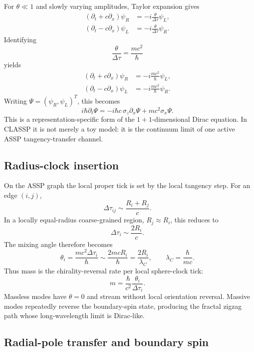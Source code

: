 \documentclass[11pt,a4paper]{article}
\begin{document}
For \(\theta\ll1\) and slowly varying amplitudes, Taylor expansion gives
\begin{align}
  (\partial_t+c\partial_x)\psi_R
    &=-i\frac{\theta}{\Delta\tau}\psi_L,
  \label{eq:chiral_R_theta}\\
  (\partial_t-c\partial_x)\psi_L
    &=-i\frac{\theta}{\Delta\tau}\psi_R.
  \label{eq:chiral_L_theta}
\end{align}
Identifying
\[
  \frac{\theta}{\Delta\tau}=\frac{mc^2}{\hbar}
\]
yields
\begin{align}
  (\partial_t+c\partial_x)\psi_R
    &=-i\frac{mc^2}{\hbar}\psi_L,
  \label{eq:chiral_R}\\
  (\partial_t-c\partial_x)\psi_L
    &=-i\frac{mc^2}{\hbar}\psi_R.
  \label{eq:chiral_L}
\end{align}
Writing \(\Psi=(\psi_R,\psi_L)^T\), this becomes
\[
  \boxed{
  i\hbar\partial_t\Psi
  =
  -i\hbar c\,\sigma_z\partial_x\Psi
  +mc^2\sigma_x\Psi.}
  \label{eq:dirac_1d}
\]
This is a representation-specific form of the \(1+1\)-dimensional Dirac
equation.  In CLASSP it is not merely a toy model: it is the continuum limit of
one active ASSP tangency-transfer channel.

\subsection{Radius-clock insertion}

On the ASSP graph the local proper tick is set by the local tangency step.  For
an edge \((i,j)\),
\[
  \Delta\tau_{ij}\sim\frac{R_i+R_j}{c}.
  \label{eq:tick_radius_edge}
\]
In a locally equal-radius coarse-grained region, \(R_j\approx R_i\), this
reduces to
\[
  \Delta\tau_i\sim\frac{2R_i}{c}.
  \label{eq:tick_radius}
\]
The mixing angle therefore becomes
\[
  \theta_i
  =
  \frac{mc^2\Delta\tau_i}{\hbar}
  \sim
  \frac{2mcR_i}{\hbar}
  =
  \frac{2R_i}{\lambda_C},
  \qquad
  \lambda_C=\frac{\hbar}{mc}.
  \label{eq:theta_radius}
\]
Thus mass is the chirality-reversal rate per local sphere-clock tick:
\[
  \boxed{
  m=\frac{\hbar}{c^2}\frac{\theta_i}{\Delta\tau_i}.}
  \label{eq:mass_flip}
\]
Massless modes have \(\theta=0\) and stream without local orientation reversal.
Massive modes repeatedly reverse the boundary-spin state, producing the
fractal zigzag path whose long-wavelength limit is Dirac-like.

\subsection{Radial-pole transfer and boundary spin}
\end{document}
